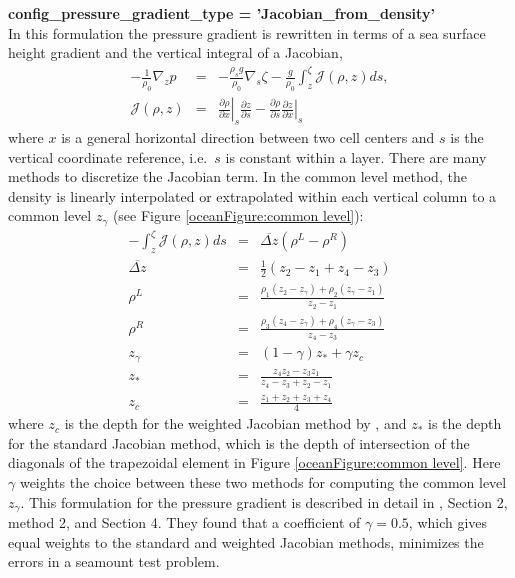 {\bf \large config\_pressure\_gradient\_type = 'Jacobian\_from\_density'}\\
In this formulation the pressure gradient is rewritten in terms of a sea surface height gradient and the vertical integral of a Jacobian,
\begin{eqnarray}
\label{ocean:grad p Jacobian}
- \frac{1}{\rho_0}\nabla_z p &=& - \frac{\rho_s g}{\rho_0}\nabla_s \zeta - \frac{g}{\rho_0}\int_z^\zeta {\mathcal J}(\rho,z)ds, \\
{\mathcal J}(\rho,z) &=& \left. \frac{\partial \rho}{\partial x} \right|_s \frac{\partial z}{\partial s} 
 - \frac{\partial \rho}{\partial s}  \left. \frac{\partial z}{\partial x} \right|_s 
\end{eqnarray}
where $x$ is a general horizontal direction between two cell centers and $s$ is the vertical coordinate reference, i.e.\ $s$ is constant within a layer.  There are many methods to discretize the Jacobian term.  In the common level method, the density is linearly interpolated or extrapolated within each vertical column to a common level $z_\gamma$ (see Figure \ref{oceanFigure:common level}):
\begin{eqnarray}
- \int_z^\zeta {\mathcal J}(\rho,z)ds &=& \overline{\Delta z} \left( \rho^L - \rho^R \right) \\
\overline{\Delta z} &=& \frac{1}{2} \left(z_2-z_1 + z_4-z_3\right) \\
\rho^L &=& \frac{\rho_1\left(z_2-z_\gamma\right) + \rho_2\left(z_\gamma-z_1\right) }{z_2-z_1}\\
\rho^R &=& \frac{\rho_3\left(z_4-z_\gamma\right) + \rho_4\left(z_\gamma-z_3\right) }{z_4-z_3}\\
z_\gamma &=& \left(1-\gamma\right)z_* + \gamma z_c \\
z_* &=&  \frac{z_4 z_2-z_3z_1}{z_4-z_3 + z_2-z_1} \\
z_c &=&  \frac{z_1+z_2+z_3+z_4}{4} 
\end{eqnarray}
where $z_c$ is the depth for the weighted Jacobian method by \citet{Song98mwr}, and $z_*$ is the depth for the standard Jacobian method, which is the depth of intersection of the diagonals of the trapezoidal element in Figure \ref{oceanFigure:common level}.  Here $\gamma$ weights the choice between these two methods for computing the common level $z_\gamma$.  This formulation for the pressure gradient is described in detail in \citet{Shchepetkin_McWilliams03jgr}, Section 2, method 2, and Section 4.  They found that a coefficient of $\gamma=0.5$, which gives equal weights to the standard and weighted Jacobian methods, minimizes the errors in a seamount test problem.

